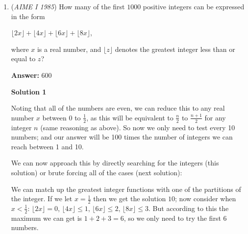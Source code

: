 \begin{enumerate}
 
- AlexLikeMath

 



\textbf{Solution 3 (trig)}

Using the first diagram above,
 \[\sin \frac{\alpha}{2} = \frac{1}{r}\]
 \[\sin \frac{\beta}{2} = \frac{1.5}{r}\]
 \[\sin(\frac{\alpha}{2}+\frac{\beta}{2})=\frac{2}{r}\]by the Pythagorean trig identities,
 \[\cos\frac{\alpha}{2}=\sqrt{1-\frac{1}{r^2}}\]
 \[\cos\frac{\beta}{2}=\sqrt{1-\frac{2.25}{r^2}}\]so by the composite sine identity
 \[\frac{2}{r}=\frac{1}{r}\sqrt{1-\frac{2.25}{r^2}}+\frac{1.5}{r}\sqrt{1-\frac{1}{r^2}}\]multiply both sides by $2r$, then subtract $\sqrt{4-\frac{9}{r^2}}$ from both sidessquaring both sides, we get
 \[16 - 8\sqrt{4-\frac{9}{r^2}} + 4 - \frac{9}{r^2}=9 - \frac{9}{r^2}\]
 \[\Longrightarrow 16+4=9+8\sqrt{4-\frac{9}{r^2}}\Longrightarrow\frac{11}{8}=\sqrt{4-\frac{9}{r^2}}\Longrightarrow\frac{121}{64}=4-\frac{9}{r^2}\]
 \[\Longrightarrow\frac{(256-121)r^2}{64}=9\Longrightarrow r^2= \frac{64}{15}\]plugging this back in,
 \[\cos^2(\frac{\alpha}{2})=1-\frac{15}{64}=\frac{49}{64}\]so
 \[\cos(\alpha)=2(\frac{49}{64})-1=\frac{34}{64}=\frac{17}{32}\]and the answer is $17+32=\boxed{049}$



	\item (\textit{AIME I 1985}) How many of the first $1000$ positive integers can be expressed in the form


 $\lfloor 2x \rfloor + \lfloor 4x \rfloor + \lfloor 6x \rfloor + \lfloor 8x \rfloor$,


 where $x$ is a real number, and $\lfloor z \rfloor$ denotes the greatest integer less than or equal to $z$? 


 
 \textbf{Answer: }600



\textbf{Solution 1}

Noting that all of the numbers are even, we can reduce this to any real number $x$ between $0$ to $\frac 12$, as this will be equivalent to $\frac n2$ to $\frac {n+1}2$ for any integer $n$ (same reasoning as above). So now we only need to test every 10 numbers; and our answer will be 100 times the number of integers we can reach between 1 and 10. 

 We can now approach this by directly searching for the integers (this solution) or brute forcing all of the cases (next solution):

 We can match up the greatest integer functions with one of the partitions of the integer. If we let $x = \frac 12$ then we get the solution $10$; now consider when $x < \frac 12$: $\lfloor 2x \rfloor = 0$, $\lfloor 4x \rfloor \le 1$, $\lfloor 6x \rfloor \le 2$, $\lfloor 8x \rfloor \le 3$. But according to this the maximum we can get is $1+2+3 = 6$, so we only need to try the first 6 numbers.


\end{enumerate}
